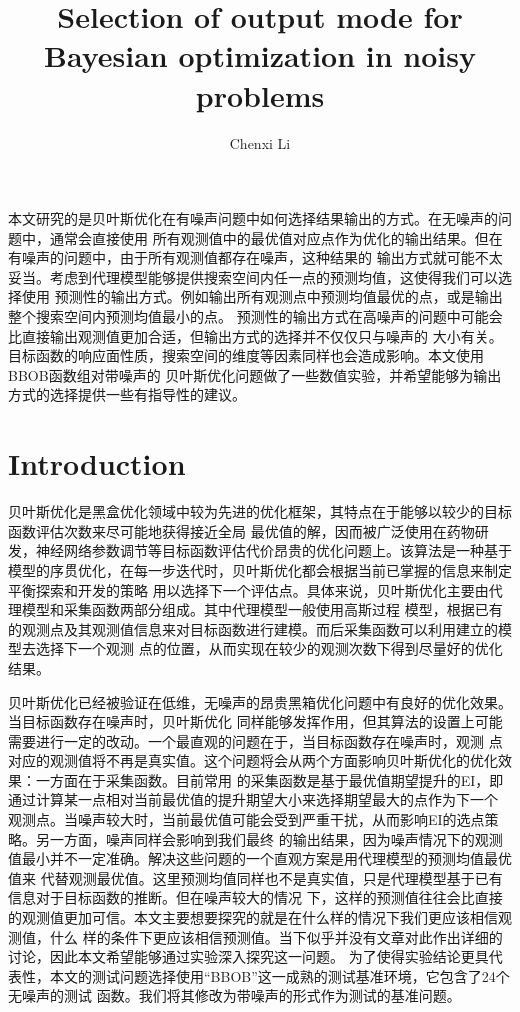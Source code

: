 \documentclass[a4paper,10pt]{article}
\title{Selection of output mode for Bayesian optimization in noisy problems}
\author{Chenxi Li}
\begin{document}
\maketitle
本文研究的是贝叶斯优化在有噪声问题中如何选择结果输出的方式。在无噪声的问题中，通常会直接使用
所有观测值中的最优值对应点作为优化的输出结果。但在有噪声的问题中，由于所有观测值都存在噪声，这种结果的
输出方式就可能不太妥当。考虑到代理模型能够提供搜索空间内任一点的预测均值，这使得我们可以选择使用
预测性的输出方式。例如输出所有观测点中预测均值最优的点，或是输出整个搜索空间内预测均值最小的点。
预测性的输出方式在高噪声的问题中可能会比直接输出观测值更加合适，但输出方式的选择并不仅仅只与噪声的
大小有关。目标函数的响应面性质，搜索空间的维度等因素同样也会造成影响。本文使用BBOB函数组对带噪声的
贝叶斯优化问题做了一些数值实验，并希望能够为输出方式的选择提供一些有指导性的建议。

\section{Introduction}
贝叶斯优化是黑盒优化领域中较为先进的优化框架，其特点在于能够以较少的目标函数评估次数来尽可能地获得接近全局
最优值的解，因而被广泛使用在药物研发，神经网络参数调节等目标函数评估代价昂贵的优化问题上。该算法是一种基于
模型的序贯优化\cite{7352306}，在每一步迭代时，贝叶斯优化都会根据当前已掌握的信息来制定平衡探索和开发的策略
用以选择下一个评估点。具体来说，贝叶斯优化主要由代理模型和采集函数两部分组成。其中代理模型一般使用高斯过程
模型，根据已有的观测点及其观测值信息来对目标函数进行建模。而后采集函数可以利用建立的模型去选择下一个观测
点的位置，从而实现在较少的观测次数下得到尽量好的优化结果。

贝叶斯优化已经被验证在低维，无噪声的昂贵黑箱优化问题中有良好的优化效果。当目标函数存在噪声时，贝叶斯优化
同样能够发挥作用，但其算法的设置上可能需要进行一定的改动。一个最直观的问题在于，当目标函数存在噪声时，观测
点对应的观测值将不再是真实值。这个问题将会从两个方面影响贝叶斯优化的优化效果：一方面在于采集函数。目前常用
的采集函数是基于最优值期望提升的EI，即通过计算某一点相对当前最优值的提升期望大小来选择期望最大的点作为下一个
观测点。当噪声较大时，当前最优值可能会受到严重干扰，从而影响EI的选点策略。另一方面，噪声同样会影响到我们最终
的输出结果，因为噪声情况下的观测值最小并不一定准确。解决这些问题的一个直观方案是用代理模型的预测均值最优值来
代替观测最优值。这里预测均值同样也不是真实值，只是代理模型基于已有信息对于目标函数的推断。但在噪声较大的情况
下，这样的预测值往往会比直接的观测值更加可信。本文主要想要探究的就是在什么样的情况下我们更应该相信观测值，什么
样的条件下更应该相信预测值。当下似乎并没有文章对此作出详细的讨论，因此本文希望能够通过实验深入探究这一问题。
为了使得实验结论更具代表性，本文的测试问题选择使用“BBOB”这一成熟的测试基准环境，它包含了24个无噪声的测试
函数。我们将其修改为带噪声的形式作为测试的基准问题。
\end{document}
